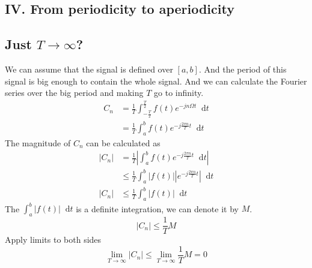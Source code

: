 \documentclass[margin,line]{res}
\newcommand*{\dif}{\mathop{}\!\mathrm{d}}
\begin{document}
\begin{resume}
\section{\sc IV. From periodicity to aperiodicity}
\subsection{\textbf{Just $T \rightarrow \infty$?}}
We can assume that the signal is defined over $[a,b]$. And the period of this signal is big enough to contain the whole signal. And we can calculate the Fourier series over the big period and making $T$ go to infinity.
\begin{align}
	C_n &= \frac{1}{T} \int_{-\frac{T}{2}}^{\frac{T}{2}} f(t) e^{-jn\Omega t} \dif t \nonumber \\ 
		&= \frac{1}{T} \int_{a}^{b} f(t) e^{-j \frac{2\pi n}{T} t} \dif t \nonumber
\end{align} 
The magnitude of $C_n$ can be calculated as
\begin{align}
	\left| C_n \right| 
	&= \frac{1}{T} \left| \int_{a}^{b} f(t) e^{-j \frac{2\pi n}{T} t} \dif t \right| \nonumber \\
	&\leq \frac{1}{T} \int_{a}^{b} \left| f(t) \right| \left| e^{-j\frac{2\pi n}{T} t} \right| \dif t \nonumber \\
	\left| C_n \right| 
	& \leq \frac{1}{T} \int_{a}^{b} \left| f(t) \right| \dif t \nonumber
\end{align}
The $\int_{a}^{b} \left| f(t) \right| \dif t $ is a definite integration, we can denote it by $M$.
$$
\left| C_n \right| \leq \frac{1}{T} M
$$
Apply limits to both sides
$$
\lim_{T\rightarrow \infty} \left| C_n \right| \leq \lim_{T\rightarrow \infty} \frac{1}{T} M = 0
$$

\end{resume}
\end{document}
